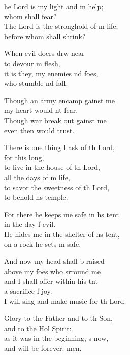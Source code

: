 \settowidth{\versewidth}{He hides me in the shelter of his tent, *}
\begin{psalmverse}%
  \begin{patverse}
he Lord is my light and m help;\Med\\
whom shall  fear?\\
The Lord is the stronghold of m life;\Med\\
before whom shall  shrink?

When evil-doers drw near\Med\\
to devour m flesh,\\
it is they, my enemies nd foes,\Med\\
who stumble nd fall.

Though an army encamp gainst me\Med\\
my heart would nt fear.\\
Though war break out gainst me\Med\\
even then would  trust.

There is one thing I ask of th Lord,\Med\\
for this  long,\\
to live in the house of th Lord,\Med\\
all the days of m life,\\
to savor the sweetness of th Lord,\Med\\
to behold h\pointup{\i}s temple.

For there he keeps me safe in h\pointup{\i}s tent\Med\\
in the day f evil.\\
He hides me in the shelter of h\pointup{\i}s tent,\Med\\
on a rock he sets m safe.

And now my head shall b raised\Med\\
above my foes who srround me\\
and I shall offer within his tnt\Flex\\
a sacrifice f joy.\Med\\
I will sing and make music for th Lord.

Glory to the Father and to th Son,\Med\\
and to the Hol Spirit:\\
as it was in the beginning, \pointup{\i}s now,\Med\\
and will be forever. men.
  \end{patverse}
\end{psalmverse}
